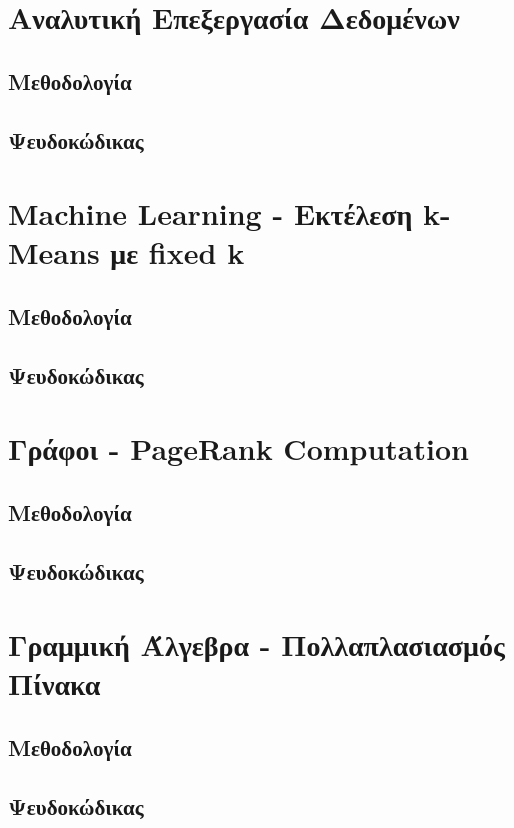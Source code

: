 \documentclass{ntua}
\begin{document}
\justify

\section{Αναλυτική Επεξεργασία Δεδομένων}

\subsection{Μεθοδολογία}

\subsection{Ψευδοκώδικας}

\newpage

\section{Machine Learning - Εκτέλεση k-Means με fixed k}

\subsection{Μεθοδολογία}

\subsection{Ψευδοκώδικας}

\newpage

\section{Γράφοι - PageRank Computation}

\subsection{Μεθοδολογία}

\subsection{Ψευδοκώδικας}

\newpage

\section{Γραμμική Άλγεβρα - Πολλαπλασιασμός Πίνακα}

\subsection{Μεθοδολογία}

\subsection{Ψευδοκώδικας}
\end{document}
